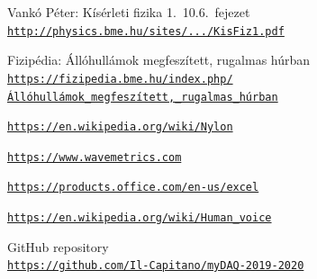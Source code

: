 \documentclass[a4paper,12pt]{article}
\begin{document}
\begin{thebibliography}{h!}

Vankó Péter: Kísérleti fizika 1.\ 10.6.\ fejezet \\
\href{http://physics.bme.hu/sites/physics.bme.hu/files/users/BMETE11AF42_kov/KisFiz1.pdf}
{\texttt{http://physics.bme.hu/sites/.../KisFiz1.pdf}}

Fizipédia: Állóhullámok megfeszített, rugalmas húrban \\
\href{https://fizipedia.bme.hu/index.php/\%C3\%81ll\%C3\%B3hull\%C3\%A1mok_megfesz\%C3\%ADtett,_rugalmas_h\%C3\%BArban}
{\texttt{https://fizipedia.bme.hu/index.php/ \\Állóhullámok\_megfeszített,\_rugalmas\_húrban}}

\href{https://en.wikipedia.org/wiki/Nylon}
{\texttt{https://en.wikipedia.org/wiki/Nylon}}

\href{https://www.wavemetrics.com}
{\texttt{https://www.wavemetrics.com}}

\href{https://products.office.com/en-us/excel}
{\texttt{https://products.office.com/en-us/excel}}

\href{https://en.wikipedia.org/wiki/Human_voice}
{\texttt{https://en.wikipedia.org/wiki/Human\_voice}}

GitHub repository \\
\href{https://github.com/Il-Capitano/myDAQ-2019-2020}
{\texttt{https://github.com/Il-Capitano/myDAQ-2019-2020}}

\end{thebibliography}
\end{document}

